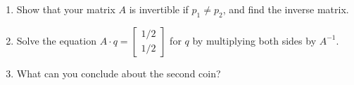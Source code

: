 \documentclass[12 pt]{report}
\begin{document}
\begin{enumerate}
\begin{enumerate}
\vfill

\item Show that your matrix $A$ is invertible if $p_1 \neq p_2$, and find the inverse matrix. 

\vfill

\item Solve the equation $A \cdot q = \begin{bmatrix} 1/2 \\ 1/2 \end{bmatrix}$ for $q$ by multiplying both sides by $A^{-1}$. 

\vfill

\item What can you conclude about the second coin?

\vspace{2cm}
\end{enumerate}

\end{enumerate}
\end{document}
